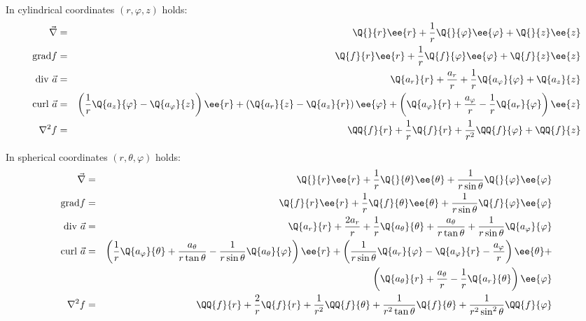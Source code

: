 In cylindrical coordinates $(r,\varphi,z)$ holds:
\begin{eqnarray*}
\vec{\nabla}     &=&\Q{}{r}\ee{r}+\frac{1}{r}\Q{}{\varphi}\ee{\varphi}+\Q{}{z}\ee{z}\\
{\rm grad}f      &=&\Q{f}{r}\ee{r}+\frac{1}{r}\Q{f}{\varphi}\ee{\varphi}+\Q{f}{z}\ee{z}\\
{\rm div}~\vec{a}&=&\Q{a_r}{r}+\frac{a_r}{r}+\frac{1}{r}\Q{a_\varphi}{\varphi}+\Q{a_z}{z}\\
{\rm curl}~\vec{a}&=&\left(\frac{1}{r}\Q{a_z}{\varphi}-\Q{a_\varphi}{z}\right)\ee{r}+
                    \left(\Q{a_r}{z}-\Q{a_z}{r}\right)\ee{\varphi}+
                    \left(\Q{a_\varphi}{r}+\frac{a_\varphi}{r}-\frac{1}{r}\Q{a_r}{\varphi}\right)\ee{z}\\
\nabla^2 f       &=&\QQ{f}{r}+\frac{1}{r}\Q{f}{r}+\frac{1}{r^2}\QQ{f}{\varphi}+\QQ{f}{z}
\end{eqnarray*}

In spherical coordinates $(r,\theta,\varphi)$ holds:
\begin{eqnarray*}
\vec{\nabla}     &=&\Q{}{r}\ee{r}+\frac{1}{r}\Q{}{\theta}\ee{\theta}+\frac{1}{r\sin\theta}\Q{}{\varphi}\ee{\varphi}\\
{\rm grad}f      &=&\Q{f}{r}\ee{r}+\frac{1}{r}\Q{f}{\theta}\ee{\theta}+\frac{1}{r\sin\theta}\Q{f}{\varphi}\ee{\varphi}\\
{\rm div}~\vec{a}&=&\Q{a_r}{r}+\frac{2a_r}{r}+\frac{1}{r}\Q{a_\theta}{\theta}+\frac{a_\theta}{r\tan\theta}+\frac{1}{r\sin\theta}\Q{a_\varphi}{\varphi}\\
{\rm curl}~\vec{a}&=&\left(\frac{1}{r}\Q{a_\varphi}{\theta}+\frac{a_\theta}{r\tan\theta}-\frac{1}{r\sin\theta}\Q{a_\theta}{\varphi}\right)\ee{r}+
                    \left(\frac{1}{r\sin\theta}\Q{a_r}{\varphi}-\Q{a_\varphi}{r}-\frac{a_\varphi}{r}\right)\ee{\theta}+\\
                 &&\left(\Q{a_\theta}{r}+\frac{a_\theta}{r}-\frac{1}{r}\Q{a_r}{\theta}\right)\ee{\varphi}\\
\nabla^2 f       &=&\QQ{f}{r}+\frac{2}{r}\Q{f}{r}+\frac{1}{r^2}\QQ{f}{\theta}+\frac{1}{r^2\tan\theta}\Q{f}{\theta}+\frac{1}{r^2\sin^2\theta}\QQ{f}{\varphi}
\end{eqnarray*}

